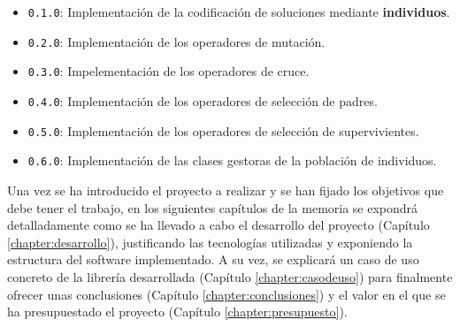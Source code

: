 \begin{itemize}
    \item \texttt{0.1.0}: Implementación de la codificación de soluciones mediante \textbf{individuos}.
    \item \texttt{0.2.0}: Implementación de los operadores de mutación.
    \item \texttt{0.3.0}: Impelementación de los operadores de cruce.
    \item \texttt{0.4.0}: Implementación de los operadores de selección de padres. 
    \item \texttt{0.5.0}: Implementación de los operadores de selección de supervivientes.
    \item \texttt{0.6.0}: Implementación de las clases gestoras de la población de individuos.
\end{itemize}

Una vez se ha introducido el proyecto a realizar y se han fijado los objetivos que debe tener el trabajo, en los siguientes capítulos de la memoria se expondrá detalladamente como se ha llevado a cabo el desarrollo del proyecto (Capítulo \ref{chapter:desarrollo}), justificando las tecnologías utilizadas y exponiendo la estructura del software implementado. A su vez, se explicará un caso de uso concreto de la librería desarrollada (Capítulo \ref{chapter:casodeuso}) para finalmente ofrecer unas conclusiones (Capítulo \ref{chapter:conclusiones}) y el valor en el que se ha presupuestado el proyecto (Capítulo \ref{chapter:presupuesto}).